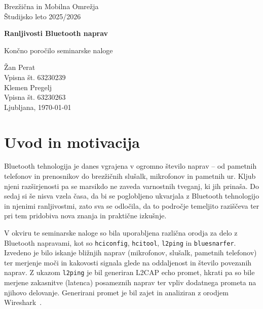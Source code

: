 \documentclass[11pt,a4paper,slovene]{article}
\begin{document}
\label{naslov}
\thispagestyle{empty}

\begin{center}
\begin{Large}
Brez\v{z}i\v{c}na in Mobilna Omre\v{z}ja\\
Študijsko leto 2025/2026\\
\end{Large}

\vspace*{4cm}
\begin{LARGE}
\textbf{Ranljivosti Bluetooth naprav\\}
\end{LARGE}
\vspace*{0.5cm}

\begin{Large}
Končno poročilo seminarske naloge\\

\vspace*{4cm}

Žan Perat\\
Vpisna št. 63230239\\
Klemen Pregelj\\
Vpisna št. 63230263\\

\vspace*{5cm}
Ljubljana, \today
\end{Large}
\end{center}

\pagebreak
\setcounter{page}{1}


\label{Kazalo}
\tableofcontents
\thispagestyle{empty}
\pagebreak

\section{Uvod in motivacija}
Bluetooth tehnologija je danes vgrajena v ogromno število naprav – od pametnih telefonov in prenosnikov do brezžičnih slušalk, mikrofonov in pametnih ur. Kljub njeni razširjenosti pa se marsikdo ne zaveda varnostnih tveganj, ki jih prinaša. Do sedaj si še nisva vzela časa, da bi se poglobljeno ukvarjala z Bluetooth tehnologijo in njenimi ranljivostmi, zato sva se odločila, da to področje temeljito raziščeva ter pri tem pridobiva nova znanja in praktične izkušnje.

V okviru te seminarske naloge so bila uporabljena različna orodja za delo z Bluetooth napravami, kot so \texttt{hciconfig}, \texttt{hcitool}, \texttt{l2ping} in \texttt{bluesnarfer}. Izvedeno je bilo iskanje bližnjih naprav (mikrofonov, slušalk, pametnih telefonov) ter merjenje moči in kakovosti signala glede na oddaljenost in število povezanih naprav. Z ukazom \texttt{l2ping} je bil generiran L2CAP echo promet, hkrati pa so bile merjene zakasnitve (latenca) posameznih naprav ter vpliv dodatnega prometa na njihovo delovanje. Generirani promet je bil zajet in analiziran z orodjem Wireshark~\cite{wireshark}.
\end{document}
